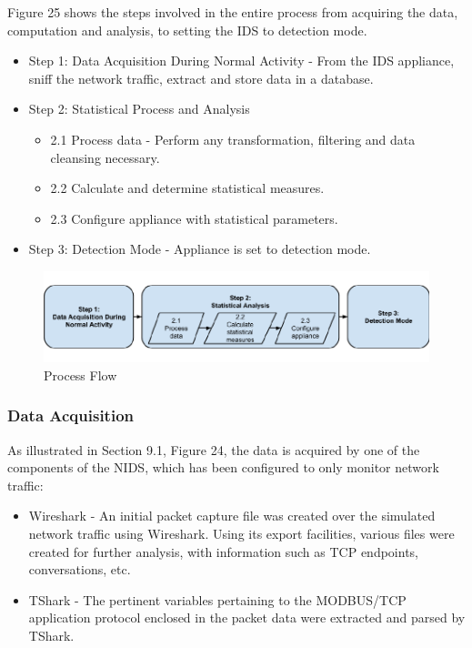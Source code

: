 \documentclass[11pt,a4paper]{article}
\begin{document}
Figure 25 shows the steps involved in the entire process from acquiring
the data, computation and analysis, to setting the IDS to detection
mode.

\begin{itemize}
\itemsep1pt\parskip0pt
\item
  Step 1: Data Acquisition During Normal Activity - From the IDS
  appliance, sniff the network traffic, extract and store data in a
  database.
\item
  Step 2: Statistical Process and Analysis

  \begin{itemize}
  \itemsep1pt\parskip0pt
  \item
    2.1 Process data - Perform any transformation, filtering and data
    cleansing necessary.
  \item
    2.2 Calculate and determine statistical measures.
  \item
    2.3 Configure appliance with statistical parameters.
  \end{itemize}
\item
  Step 3: Detection Mode - Appliance is set to detection mode.
\end{itemize}

\begin{figure}[h]

{\centering \includegraphics{thesis_files/figure-latex/unnamed-chunk-37-1} 

}

\caption{Process Flow}\label{fig:unnamed-chunk-37}
\end{figure}

\subsubsection{Data Acquisition}\label{data-acquisition}

As illustrated in Section 9.1, Figure 24, the data is acquired by one of
the components of the NIDS, which has been configured to only monitor
network traffic:

\begin{itemize}
\itemsep1pt\parskip0pt
\item
  Wireshark - An initial packet capture file was created over the
  simulated network traffic using Wireshark. Using its export
  facilities, various files were created for further analysis, with
  information such as TCP endpoints, conversations, etc.
\item
  TShark - The pertinent variables pertaining to the MODBUS/TCP
  application protocol enclosed in the packet data were extracted and
  parsed by TShark.
\end{itemize}
\end{document}

